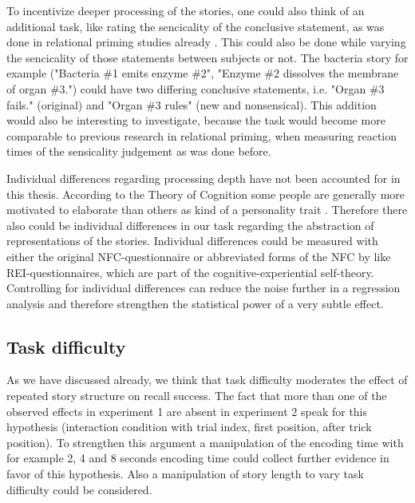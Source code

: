 \documentclass[a4paper,man,natbib,floatsintext,import]{apa6}
\begin{document}
To incentivize deeper processing of the stories, one could also think of an additional task, like rating the sencicality of the conclusive statement, as was done in relational priming studies already \citep{Estes2006,Popov2015}. This could also be done while varying the sencicality of those statements between subjects or not. The bacteria story for example ("Bacteria \#1 emits enzyme \#2", "Enzyme \#2 dissolves the membrane of organ \#3.") could have two differing conclusive statements, i.e. "Organ \#3 fails." (original) and "Organ \#3 rules" (new and nonsensical). This addition would also be interesting to investigate, because the task would become more comparable to previous research in relational priming, when measuring reaction times of the sensicality judgement as was done before.

Individual differences regarding processing depth have not been accounted for in this thesis. According to the Theory of Cognition some people are generally more motivated to elaborate than others as kind of a personality trait \citep{Cacioppo1982,Cacioppo1996}. Therefore there also could be individual differences in our task regarding the abstraction of representations of the stories. Individual differences could be measured with either the original NFC-questionnaire \citep{Cacioppo1982} or abbreviated forms of the NFC by \cite{Epstein1996} like REI-questionnaires, which are part of the cognitive-experiential self-theory. Controlling for individual differences can reduce the noise further in a regression analysis and therefore strengthen the statistical power of a very subtle effect.

\subsection{Task difficulty}
As we have discussed already, we think that task difficulty moderates the effect of repeated story structure on recall success. The fact that more than one of the observed effects in experiment 1 are absent in experiment 2  speak for this hypothesis (interaction condition with trial index, first position, after trick position). To strengthen this argument a manipulation of the encoding time with for example 2, 4 and 8 seconds encoding time could collect further evidence in favor of this hypothesis. Also a manipulation of story length to vary task difficulty could be considered.

\end{document}
